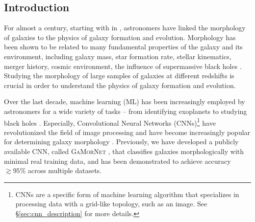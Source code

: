 \documentclass[twocolumn]{aastex63}
\newcommand\gamornet{G\textsc{a}M\textsc{or}N\textsc{et}}
\begin{document}
\begin{CJK*}{UTF8}{gbsn}

\vspace{10pt}

\section{Introduction} \label{sec:intro}
For almost a century, starting with \citeauthor{hubble_1926} in \citeyear{hubble_1926}, astronomers have linked the morphology of galaxies to the physics of  galaxy formation and evolution. Morphology has been shown to be related to many fundamental properties of the galaxy and its environment, including galaxy mass, star formation rate, stellar kinematics, merger history, cosmic environment, the influence of supermassive black holes \citep[e.g.,][]{Bender1992DynamicallyProperties,Tremaine2002TheCorrelation,pozzetti_10, wuyts_11, Schawinski2014TheGalaxies, Huertas-Company2016MassCANDELS,powell_17, Shimakawa2021Subaru0.30.6, Dimauro2022CoincidenceGrowth}. Studying the morphology of large samples of galaxies at different redshifts is crucial in order to understand the physics of galaxy formation and evolution. 

Over the last decade, machine learning (ML) has been increasingly employed by astronomers for a wide variety of tasks -- from identifying exoplanets to studying black holes \citep[e.g.,][]{ml_pz,ml_sz,Shallue2018IdentifyingKepler-90,Sharma2020ApplicationClassification,Natarajan2021QuasarNet:Holes}. Especially, Convolutional Neural Networks (CNNs)\footnote{CNNs are a specific form of machine learning algorithm that specializes in processing data with a grid-like topology, such as an image. See \S \ref{sec:cnn_description} for more details.} have revolutionized the field of image processing and have become increasingly popular for determining galaxy morphology \citep[e.g.,][]{Dieleman2015Rotation-invariantPrediction, Huertas-Company2015ALEARNING, Tuccillo2018DeepFitting, Hausen2020MorpheusData, Walmsley2020GalaxyLearning, Cheng2021GalaxyNetworks, Vega-Ferrero2021PushingSurvey, Tarsitano2022ImageLearning}. Previously, we have developed a publicly available CNN, called \gamornet{} \citep{Ghosh2020GalaxyGalaxies}, that classifies galaxies morphologically with minimal real training data, and has been demonstrated to achieve accuracy $\gtrsim 95\%$ across multiple datasets. 


\end{CJK*}
\end{document}
